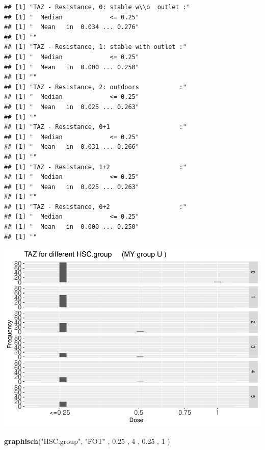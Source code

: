 \documentclass[
]{article}
\newenvironment{Shaded}{\begin{snugshade}}{\end{snugshade}}
\newcommand{\DecValTok}[1]{\textcolor[rgb]{0.00,0.00,0.81}{#1}}
\newcommand{\FloatTok}[1]{\textcolor[rgb]{0.00,0.00,0.81}{#1}}
\newcommand{\KeywordTok}[1]{\textcolor[rgb]{0.13,0.29,0.53}{\textbf{#1}}}
\newcommand{\NormalTok}[1]{#1}
\newcommand{\StringTok}[1]{\textcolor[rgb]{0.31,0.60,0.02}{#1}}
\begin{document}
\begin{verbatim}
## [1] "TAZ - Resistance, 0: stable w\\o  outlet :"
## [1] "  Median             <= 0.25"
## [1] "  Mean   in  0.034 ... 0.276"
## [1] ""
## [1] "TAZ - Resistance, 1: stable with outlet :"
## [1] "  Median             <= 0.25"
## [1] "  Mean   in  0.000 ... 0.250"
## [1] ""
## [1] "TAZ - Resistance, 2: outdoors           :"
## [1] "  Median             <= 0.25"
## [1] "  Mean   in  0.025 ... 0.263"
## [1] ""
## [1] "TAZ - Resistance, 0+1                   :"
## [1] "  Median             <= 0.25"
## [1] "  Mean   in  0.031 ... 0.266"
## [1] ""
## [1] "TAZ - Resistance, 1+2                   :"
## [1] "  Median             <= 0.25"
## [1] "  Mean   in  0.025 ... 0.263"
## [1] ""
## [1] "TAZ - Resistance, 0+2                   :"
## [1] "  Median             <= 0.25"
## [1] "  Mean   in  0.000 ... 0.250"
## [1] ""
\end{verbatim}

\includegraphics{Verteilungen_files/figure-latex/unnamed-chunk-50-1.pdf}

\begin{Shaded}
\begin{Highlighting}[]
  \KeywordTok{graphisch}\NormalTok{(}\StringTok{"HSC.group"}\NormalTok{, }\StringTok{"FOT"}\NormalTok{ , }\FloatTok{0.25}\NormalTok{ ,   }\DecValTok{4}\NormalTok{   ,   }\FloatTok{0.25}\NormalTok{ ,   }\DecValTok{1}\NormalTok{    )  }
\end{Highlighting}
\end{Shaded}
\end{document}
